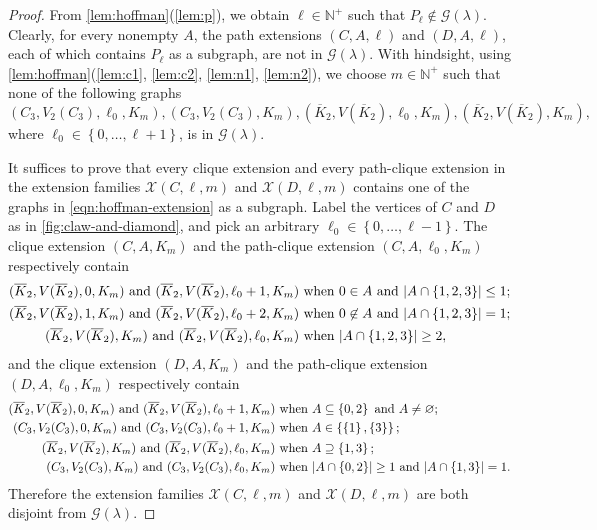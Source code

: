 \documentclass[11pt]{article}
\theoremstyle{definition}
\theoremstyle{remark}
\DeclarePairedDelimiter\abs{\lvert}{\rvert}
\newcommand{\sset}[1]{\left\{{#1}\right\}}
\newcommand{\la}{\lambda}
\newcommand{\G}{\mathcal{G}}
\newcommand{\N}{\mathbb{N}}
\newcommand{\X}{\mathcal{X}}
\newcommand{\Gl}{\G(\la)}
\begin{document}
\begin{proof}
    From \cref{lem:hoffman}(\ref{lem:p}), we obtain $\ell \in \N^+$ such that $P_\ell \not\in \Gl$. Clearly, for every nonempty $A$, the path extensions $(C, A, \ell)$ and $(D, A, \ell)$, each of which contains $P_\ell$ as a subgraph, are not in $\Gl$. With hindsight, using \cref{lem:hoffman}(\ref{lem:c1}, \ref{lem:c2}, \ref{lem:n1}, \ref{lem:n2}), we choose $m \in \N^+$ such that none of the following graphs
    \begin{equation} \label{eqn:hoffman-extension}
        (C_3, V_2(C_3), \ell_0, K_m), (C_3, V_2(C_3), K_m), (\overline{K}_2, V(\overline{K}_2), \ell_0, K_m), (\overline{K}_2, V(\overline{K}_2), K_m),
    \end{equation}
    where $\ell_0 \in \sset{0, \dots, \ell + 1}$, is in $\Gl$.

    It suffices to prove that every clique extension and every path-clique extension in the extension families $\X(C, \ell, m)$ and $\X(D, \ell, m)$ contains one of the graphs in \eqref{eqn:hoffman-extension} as a subgraph. Label the vertices of $C$ and $D$ as in \cref{fig:claw-and-diamond}, and pick an arbitrary $\ell_0 \in \sset{0, \dots, \ell - 1}$. The clique extension $(C, A, K_m)$ and the path-clique extension $(C, A, \ell_0, K_m)$ respectively contain
    \begin{align*}
        (\overline{K}_2, V(\overline{K}_2), 0, K_m) \text{ and } (\overline{K}_2, V(\overline{K}_2), \ell_0 + 1, K_m) & \text{ when } 0 \in A \text{ and }\abs{A \cap \sset{1,2,3}} \le 1;\\
        (\overline{K}_2, V(\overline{K}_2), 1, K_m) \text{ and } (\overline{K}_2, V(\overline{K}_2), \ell_0 + 2, K_m) & \text{ when } 0 \not\in A \text{ and }\abs{A \cap \sset{1,2,3}} = 1;\\
        (\overline{K}_2, V(\overline{K}_2), K_m) \text{ and } (\overline{K}_2, V(\overline{K}_2), \ell_0, K_m) & \text{ when } \abs{A \cap \sset{1,2,3}} \ge 2,
    \end{align*}
    and the clique extension $(D, A, K_m)$ and the path-clique extension $(D, A, \ell_0, K_m)$ respectively contain
    \begin{align*}
        (\overline{K}_2, V(\overline{K}_2), 0, K_m) \text{ and } (\overline{K}_2, V(\overline{K}_2), \ell_0 + 1, K_m) & \text{ when } A \subseteq \sset{0,2} \text{ and }A \neq \varnothing; \\
        (C_3, V_2(C_3), 0, K_m) \text{ and } (C_3, V_2(C_3), \ell_0 + 1, K_m) & \text{ when } A \in \sset{\sset{1}, \sset{3}}; \\
        (\overline{K}_2, V(\overline{K}_2), K_m) \text{ and } (\overline{K}_2, V(\overline{K}_2), \ell_0, K_m) & \text{ when } A \supseteq \sset{1,3}; \\
        (C_3, V_2(C_3), K_m) \text{ and } (C_3, V_2(C_3), \ell_0, K_m) & \text{ when } \abs{A \cap \sset{0,2}} \ge 1 \text{ and } \abs{A \cap \sset{1,3}} = 1.
    \end{align*}
    Therefore the extension families $\X(C, \ell, m)$ and $\X(D, \ell, m)$ are both disjoint from $\Gl$.
\end{proof}
\end{document}

